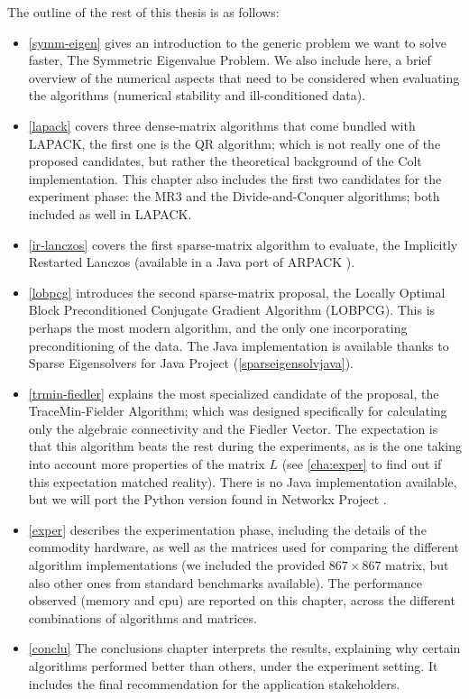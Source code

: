 The outline of the rest of this thesis is as follows: \\

\begin{itemize}
  \item \cref{symm-eigen} gives an introduction to the generic problem
    we want to solve faster, The Symmetric Eigenvalue Problem. We also
    include here, a brief overview of the numerical aspects that need
    to be considered when evaluating the algorithms (numerical
    stability and ill-conditioned data). \\
  \item \cref{lapack} covers three dense-matrix algorithms that come bundled with
    LAPACK, the first one is the QR algorithm; which is not really one
    of the proposed candidates, but rather the theoretical background
    of the Colt implementation. This chapter also includes the first two
    candidates for the experiment phase: the MR3 and the
    Divide-and-Conquer algorithms; both included as well in LAPACK. \\
  \item \cref{ir-lanczos} covers the first sparse-matrix algorithm to
    evaluate, the Implicitly Restarted Lanczos (available in a Java
    port of ARPACK \cite{arpack}). \\
  \item \cref{lobpcg} introduces the second sparse-matrix proposal,
    the Locally Optimal Block Preconditioned Conjugate Gradient
    Algorithm (LOBPCG). This is perhaps the most modern algorithm, and
    the only one incorporating preconditioning of the data. The Java
    implementation is available thanks to Sparse Eigensolvers for Java
    Project (\cref{sparseigensolvjava}).\\
  \item \cref{trmin-fiedler} explains the most specialized candidate
    of the proposal, the TraceMin-Fielder Algorithm; which was designed
    specifically for calculating only the algebraic connectivity and
    the Fiedler Vector. The expectation is that this algorithm beats the rest
    during the experiments, as is the one taking into account more
    properties of the matrix $L$ (see \cref{cha:exper} to find out if
    this expectation matched reality). There is no Java implementation
    available, but we will port the Python version found in Networkx
    Project \cite{networkx}. 
  \item \cref{exper} describes the experimentation phase, including
    the details of the commodity hardware, as well as the matrices
    used for comparing the different algorithm
    implementations (we included the provided $867 \times 867$
    matrix, but also other ones from standard benchmarks
    available). The performance observed (memory and cpu) are reported
    on this chapter, across the different combinations of algorithms
    and matrices. \\
  \item \cref{conclu} The conclusions chapter interprets the results,
    explaining why certain algorithms performed better than others,
    under the experiment setting. It includes the final recommendation
    for the application stakeholders.
\end{itemize}

